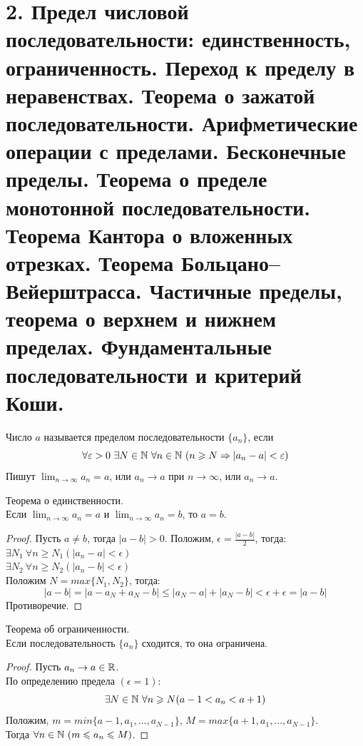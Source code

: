 \section{2. Предел числовой последовательности: единственность, ограниченность. Переход к пределу в неравенствах. Теорема о зажатой последовательности. Арифметические операции с пределами. Бесконечные пределы. Теорема о пределе монотонной последовательности. Теорема Кантора о вложенных отрезках. Теорема Больцано--Вейерштрасса. Частичные пределы, теорема о верхнем и нижнем пределах. Фундаментальные последовательности и критерий Коши.}

    \begin{definition}
        Число $a$ называется пределом последовательности $\{a_{n}\}$, если
        \[\forall \varepsilon > 0 \ \exists N \in \mathbb{N} \ \forall n \in \mathbb{N} \ (n \geqslant N \Rightarrow |a_{n}-a| < \varepsilon)\]
        Пишут $\lim_{n \to \infty} a_{n} = a$, или $a_{n} \to a$ при $n \to \infty$, или $a_{n} \to a$.
    \end{definition}
    
    \begin{theorem}{Теорема о единственности.}
        \\
        Если $\lim_{n \to \infty} a_{n} = a$ и $\lim_{n \to \infty} a_{n} = b$, то $a = b$.
    \end{theorem}
    
    \begin{proof}
        Пусть $a \neq b$, тогда $|a-b| > 0$. Положим, $\epsilon = \frac{|a-b|}{2}$, тогда:\\
        $\exists N_1 \ \forall n \geq N_{1} (|a_{n} - a| < \epsilon)$\\
        $\exists N_2 \ \forall n \geq N_{2} (|a_{n} - b| < \epsilon)$\\
        Положим $N = max\{N_{1}, N_{2}\}$, тогда:
        \[|a-b| = |a-a_{N}+a_{N}-b| \leq |a_{N}-a| + |a_{N}-b| < \epsilon + \epsilon = |a-b|\]
        Противоречие.
    \end{proof}

    \begin{theorem}{Теорема об ограниченности.}
        \\
        Если последовательность $\{a_{n}\}$ сходится, то она ограничена.
    \end{theorem}

    \begin{proof}
        Пусть $a_{n} \rightarrow a \in \mathbb{R}$.\\
        По определению предела $(\epsilon = 1)$:
        \[\exists N \in \mathbb{N} \ \forall n \geqslant N(a-1 < a_{n} < a+1)\]
        Положим, $m = min\{a-1, a_{1}, ..., a_{N-1}\}$, $M = max\{a+1, a_{1}, ..., a_{N-1}\}$.\\
        Тогда $\forall n \in \mathbb{N} \ (m \leqslant a_{n} \leqslant M)$.
    \end{proof}


